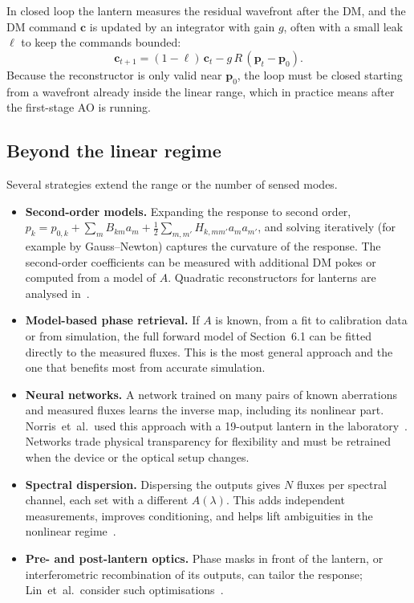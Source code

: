 \documentclass[11pt,a4paper]{article}
\newcommand{\pvec}{\mathbf{p}}
\begin{document}
In closed loop the lantern measures the residual wavefront after the DM, and the DM command $\mathbf{c}$ is updated by an integrator with gain $g$, often with a small leak $\ell$ to keep the commands bounded:
\begin{equation}
\mathbf{c}_{t+1} = (1-\ell)\,\mathbf{c}_t - g\, R\,(\pvec_t - \pvec_0).
\label{eq:integrator}
\end{equation}
Because the reconstructor is only valid near $\pvec_0$, the loop must be closed starting from a wavefront already inside the linear range, which in practice means after the first-stage AO is running.

\subsection{Beyond the linear regime}
Several strategies extend the range or the number of sensed modes.
\begin{itemize}
\item \textbf{Second-order models.} Expanding the response to second order, $p_k = p_{0,k} + \sum_m B_{km} a_m + \frac{1}{2}\sum_{m,m'} H_{k,mm'} a_m a_{m'}$, and solving iteratively (for example by Gauss--Newton) captures the curvature of the response. The second-order coefficients can be measured with additional DM pokes or computed from a model of $A$. Quadratic reconstructors for lanterns are analysed in~\cite{Lin2022,Lin2023}.
\item \textbf{Model-based phase retrieval.} If $A$ is known, from a fit to calibration data or from simulation, the full forward model of Section~6.1 can be fitted directly to the measured fluxes. This is the most general approach and the one that benefits most from accurate simulation.
\item \textbf{Neural networks.} A network trained on many pairs of known aberrations and measured fluxes learns the inverse map, including its nonlinear part. Norris~et~al.\ used this approach with a 19-output lantern in the laboratory~\cite{Norris2020}. Networks trade physical transparency for flexibility and must be retrained when the device or the optical setup changes.
\item \textbf{Spectral dispersion.} Dispersing the outputs gives $N$ fluxes per spectral channel, each set with a different $A(\lambda)$. This adds independent measurements, improves conditioning, and helps lift ambiguities in the nonlinear regime~\cite{Lin2025}.
\item \textbf{Pre- and post-lantern optics.} Phase masks in front of the lantern, or interferometric recombination of its outputs, can tailor the response; Lin~et~al.\ consider such optimisations~\cite{Lin2023}.
\end{itemize}
\end{document}
